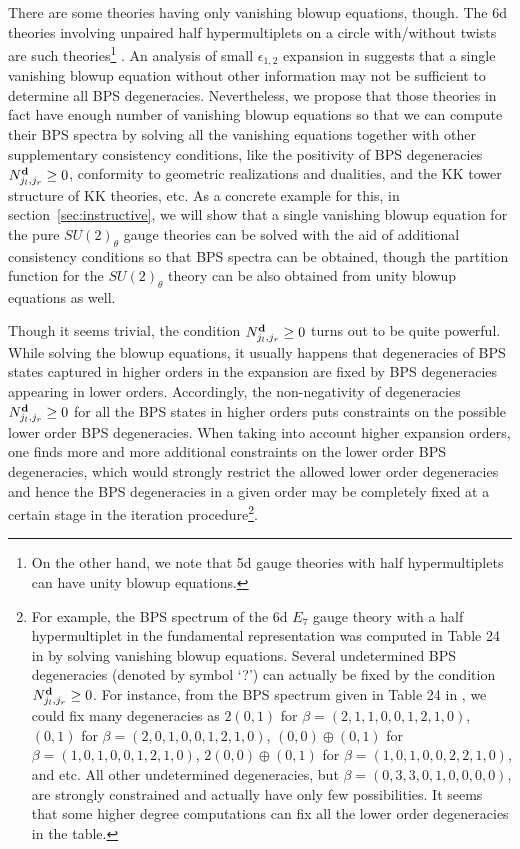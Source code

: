 There are some theories having only vanishing blowup equations, though. The 6d theories involving unpaired half hypermultiplets on a circle with/without twists are such theories\footnote{On the other hand, we note that  5d gauge theories with half hypermultiplets can have unity blowup equations.} \cite{Gu:2020fem}. An analysis of small $\epsilon_{1,2}$ expansion in \cite{Huang:2017mis} suggests that a single vanishing blowup equation without other information may not be sufficient to determine all BPS degeneracies. Nevertheless, we propose that those theories in fact have enough number of vanishing blowup equations so that we can compute their BPS spectra by solving all the vanishing equations together with other supplementary consistency conditions, like the positivity of BPS degeneracies $N_{j_l,j_r}^{\bf d} \ge 0$, conformity to geometric realizations and dualities, and the KK tower structure of KK theories, etc. As a concrete example for this, in section~\ref{sec:instructive}, we will show that a single vanishing blowup equation for the pure $SU(2)_\theta$ gauge theories can be solved with the aid of additional consistency conditions so that BPS spectra  can be obtained, though the partition function for the $SU(2)_\theta$ theory can be also obtained from unity blowup equations as well. 

Though it seems trivial, the condition $N_{j_l,j_r}^{\bf d} \ge 0$ turns out to be quite powerful. While solving the blowup equations, it usually happens that degeneracies of BPS states captured in higher orders in the expansion are fixed by BPS degeneracies appearing in lower orders. Accordingly, the non-negativity of degeneracies $N_{j_l,j_r}^{\bf d} \ge 0$ for all the BPS states in higher orders puts constraints on the possible lower order BPS degeneracies. When taking into account higher expansion orders, one finds more and more additional constraints on the lower order BPS degeneracies, which would strongly restrict the allowed lower order degeneracies and hence the BPS degeneracies in a given order may be completely fixed at a certain stage in the iteration procedure\footnote{For example, the BPS spectrum of the 6d $E_7$ gauge theory with a half hypermultiplet in the fundamental representation was computed in Table 24 in \cite{Gu:2020fem} by solving vanishing blowup equations. Several undetermined BPS degeneracies (denoted by symbol `?') can actually be fixed by the condition $N_{j_l,j_r}^{\bf d} \ge 0$. For instance, from the BPS spectrum given in Table 24 in \cite{Gu:2020fem}, we could fix many degeneracies as $2(0,1)$ for $\beta=(2,1,1,0,0,1,2,1,0)$, $(0,1)$ for $\beta=(2,0,1,0,0,1,2,1,0)$, $(0,0)\oplus(0,1)$ for $\beta=(1,0,1,0,0,1,2,1,0)$, $2(0,0)\oplus(0,1)$ for $\beta=(1,0,1,0,0,2,2,1,0)$, and etc. All other undetermined degeneracies, but $\beta= (0, 3, 3, 0, 1, 0, 0, 0, 0)$, are strongly constrained and actually have only few possibilities. It seems that some higher degree computations can fix all the lower order degeneracies in the table.}.

